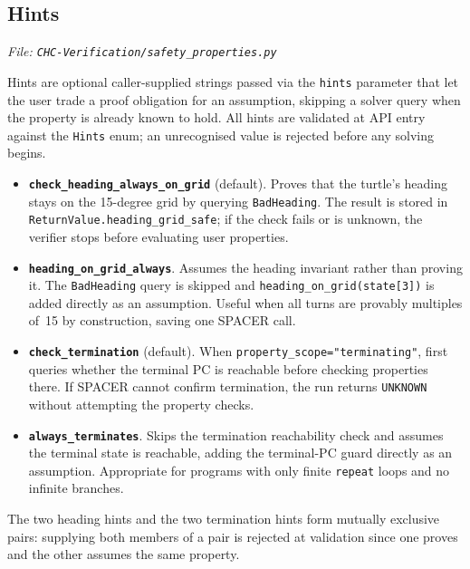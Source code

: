 \subsection*{Hints}
\noindent\textit{\small File: \texttt{CHC-Verification/safety\_properties.py}}

Hints are optional caller-supplied strings passed via the \texttt{hints} parameter that let the user trade a proof obligation for an assumption, skipping a solver query when the property is already known to hold. All hints are validated at API entry against the \texttt{Hints} enum; an unrecognised value is rejected before any solving begins.

\begin{itemize}[leftmargin=1.5em, noitemsep, topsep=4pt]
    \item \textbf{\texttt{check\_heading\_always\_on\_grid}} (default). Proves that the turtle's heading stays on the 15-degree grid by querying \texttt{BadHeading}. The result is stored in \texttt{ReturnValue.heading\_grid\_safe}; if the check fails or is unknown, the verifier stops before evaluating user properties.

    \item \textbf{\texttt{heading\_on\_grid\_always}}. Assumes the heading invariant rather than proving it. The \texttt{BadHeading} query is skipped and \texttt{heading\_on\_grid(state[3])} is added directly as an assumption. Useful when all turns are provably multiples of~15 by construction, saving one SPACER call.

    \item \textbf{\texttt{check\_termination}} (default). When \texttt{property\_scope="terminating"}, first queries whether the terminal PC is reachable before checking properties there. If SPACER cannot confirm termination, the run returns \texttt{UNKNOWN} without attempting the property checks.

    \item \textbf{\texttt{always\_terminates}}. Skips the termination reachability check and assumes the terminal state is reachable, adding the terminal-PC guard directly as an assumption. Appropriate for programs with only finite \texttt{repeat} loops and no infinite branches.
\end{itemize}

The two heading hints and the two termination hints form mutually exclusive pairs: supplying both members of a pair is rejected at validation since one proves and the other assumes the same property.
